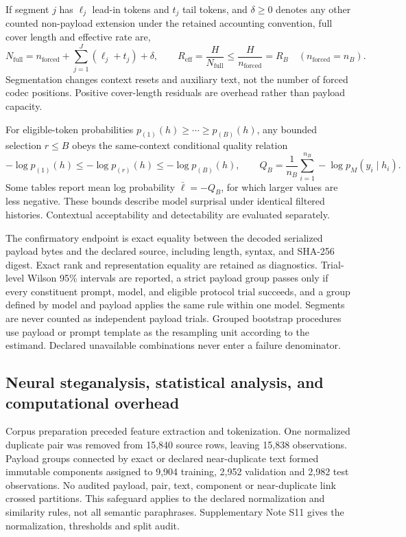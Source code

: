 \documentclass[fleqn,10pt]{wlscirep}
\begin{document}
If segment \(j\) has \(\ell_j\) lead-in tokens and \(t_j\) tail tokens, and \(\delta\ge0\) denotes any other counted non-payload extension under the retained accounting convention, full cover length and effective rate are,
\begin{equation}
N_{\mathrm{full}}
=n_{\mathrm{forced}}+\sum_{j=1}^{J}(\ell_j+t_j)+\delta,
\qquad
R_{\mathrm{eff}}=\frac{H}{N_{\mathrm{full}}}
\le\frac{H}{n_{\mathrm{forced}}}=R_B
\quad(n_{\mathrm{forced}}=n_B).
\label{eq:effective-rate}
\end{equation}
Segmentation changes context resets and auxiliary text, not the number of forced codec positions. Positive cover-length residuals are overhead rather than payload capacity.

For eligible-token probabilities \(p_{(1)}(h)\ge\cdots\ge p_{(B)}(h)\), any bounded selection \(r\le B\) obeys the same-context conditional quality relation
\begin{equation}
-\log p_{(1)}(h)
\le-\log p_{(r)}(h)
\le-\log p_{(B)}(h),\qquad
Q_B=\frac{1}{n_B}\sum_{i=1}^{n_B}-\log p_M(y_i\mid h_i).
\label{eq:quality-bound}
\end{equation}
Some tables report mean log probability \(\bar\ell=-Q_B\), for which larger values are less negative. These bounds describe model surprisal under identical filtered histories. Contextual acceptability and detectability are evaluated separately.

The confirmatory endpoint is exact equality between the decoded serialized payload bytes and the declared source, including length, syntax, and SHA-256 digest. Exact rank and representation equality are retained as diagnostics. Trial-level Wilson 95\% intervals are reported\cite{Wilson1927Interval}, a strict payload group passes only if every constituent prompt, model, and eligible protocol trial succeeds, and a group defined by model and payload applies the same rule within one model. Segments are never counted as independent payload trials. Grouped bootstrap procedures use payload or prompt template as the resampling unit according to the estimand. Declared unavailable combinations never enter a failure denominator.

\subsection*{Neural steganalysis, statistical analysis, and computational overhead}\label{sec:detector-method}\label{sec:statistics-method}

Corpus preparation preceded feature extraction and tokenization. One normalized duplicate pair was removed from 15,840 source rows, leaving 15,838 observations. Payload groups connected by exact or declared near-duplicate text formed immutable components assigned to 9,904 training, 2,952 validation and 2,982 test observations. No audited payload, pair, text, component or near-duplicate link crossed partitions. This safeguard applies to the declared normalization and similarity rules, not all semantic paraphrases. Supplementary Note S11 gives the normalization, thresholds and split audit.
\end{document}
